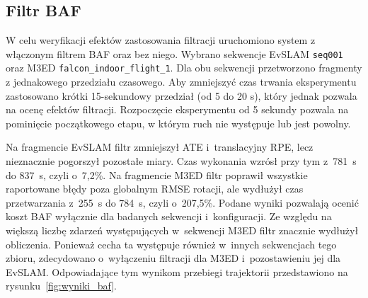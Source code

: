 \subsection{Filtr BAF}
\label{subsec:wyniki_baf}

W celu weryfikacji efektów zastosowania filtracji uruchomiono system z włączonym filtrem BAF oraz bez niego. Wybrano sekwencje EvSLAM \texttt{seq001} oraz M3ED \texttt{falcon\_indoor\_flight\_1}. Dla obu sekwencji przetworzono fragmenty z jednakowego przedziału czasowego. Aby zmniejszyć czas trwania eksperymentu zastosowano krótki 15-sekundowy przedział (od 5 do 20 s), który jednak pozwala na ocenę efektów filtracji. Rozpoczęcie eksperymentu od 5 sekundy pozwala na pominięcie początkowego etapu, w którym ruch nie występuje lub jest powolny.

\begin{table}[!ht]
    \centering
    \small
    \caption{Porównanie z~BAF i~bez BAF na fragmentach EvSLAM \texttt{seq001} i~M3ED \texttt{falcon\_indoor\_flight\_1};}
    \label{tab:wyniki_baf}
\end{table}

Na fragmencie EvSLAM filtr zmniejszył ATE i~translacyjny RPE, lecz nieznacznie pogorszył pozostałe miary. Czas wykonania wzrósł przy tym z~781~s do 837~s, czyli o~7,2\%. Na fragmencie M3ED filtr poprawił wszystkie raportowane błędy poza globalnym RMSE rotacji, ale wydłużył czas przetwarzania z~255~s do 784~s, czyli o~207,5\%. Podane wyniki pozwalają ocenić koszt BAF wyłącznie dla badanych sekwencji i~konfiguracji. Ze względu na większą liczbę zdarzeń występujących w~sekwencji M3ED filtr znacznie wydłużył obliczenia. Ponieważ cecha ta występuje również w~innych sekwencjach tego zbioru, zdecydowano o~wyłączeniu filtracji dla M3ED i~pozostawieniu jej dla EvSLAM.
Odpowiadające tym wynikom przebiegi trajektorii przedstawiono na rysunku~\ref{fig:wyniki_baf}.

